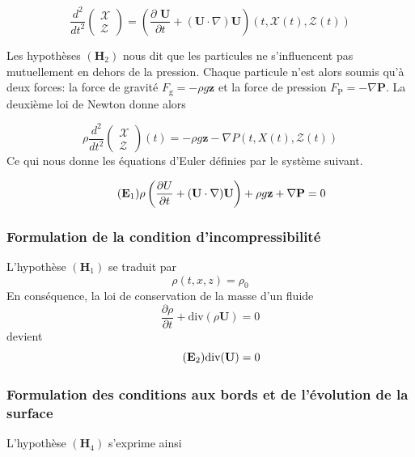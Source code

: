 \documentclass[12pt,a4paper]{article}
\numberwithin{equation}{section}
\begin{document}
$$
\frac{d^2 }{dt^2}\left(\begin{array}{l}
         \mathcal{X}\\
         \mathcal{Z}
\end{array}\right)= \left(\frac{\partial\textbf{ U}}{\partial t}+ (\textbf{U}\cdot \nabla ) \textbf{U}\right)(t,\mathcal{X}(t),\mathcal{Z}(t)) 
$$

Les hypothèses $(\textbf{H}_2)$ nous dit que les particules ne s'influencent pas mutuellement en dehors de la pression. Chaque particule n'est alors soumis qu'à deux forces: la force de gravité $ F_\text{g} = -\rho g\textbf{z}$ et la force de pression $F_\text{P} = - \nabla\textbf{P}$. La deuxième loi de Newton donne alors

$$
\rho\frac{d^2 }{dt^2}\left(\begin{array}{l}
         \mathcal{X}\\
         \mathcal{Z}
\end{array}\right)(t) = - \rho g \textbf{z} -\nabla P(t,X(t),\mathcal{Z}(t))
$$
Ce qui nous donne les équations d'Euler définies par le système suivant.

\begin{equation} 
\tag{$\textbf{E}_1$} \label{eq_E1}
\rho \left( \frac{\partial U}{\partial t} + (\textbf{U}\cdot \nabla ) \textbf{U} \right) + \rho g\textbf{z} + \nabla \textbf{P} = 0
\end{equation}


\subsubsection{Formulation de la condition d'incompressibilité}
L'hypothèse $(\textbf{H}_1)$ se traduit par
$$\rho(t,x,z) = \rho_0$$
En conséquence, la loi de conservation de la masse d'un fluide
\begin{equation} \label{mass_conservation}
    \frac{\partial \rho}{\partial t} +\text{div}(\rho\textbf{U}) = 0
\end{equation}
devient
\begin{equation} \tag{$\textbf{E}_2$} \label{divergence_free}
    \text{div} (\textbf{U}) = 0
\end{equation}

\subsubsection{Formulation des conditions aux bords et de l'évolution de la surface}

L'hypothèse $(\textbf{H}_4)$ s'exprime ainsi
\end{document}
